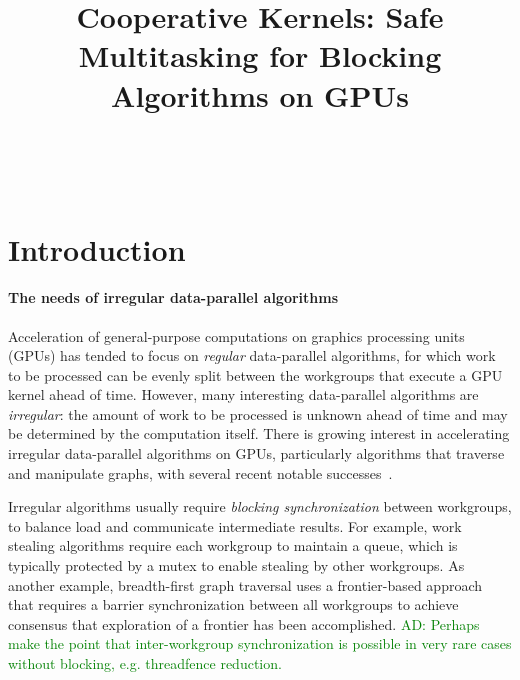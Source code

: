 \documentclass[nocopyrightspace]{sigplanconf-pldi16}
\newcommand{\ADComment}[1]{\textcolor{green}{AD: #1}}
\begin{document}
\title{Cooperative Kernels: Safe Multitasking for Blocking Algorithms on GPUs}

%
%

\authorinfo{}
{\makebox{} \\
}
{}




\maketitle

\begin{abstract}


\end{abstract}
    
\section{Introduction}\label{sec:intro}

\paragraph{The needs of irregular data-parallel algorithms}
Acceleration of general-purpose computations on graphics processing
units (GPUs) has tended to focus on \emph{regular} data-parallel
algorithms, for which work to be processed can be evenly split between
the workgroups that execute a GPU kernel ahead of time.  However, many
interesting data-parallel algorithms are \emph{irregular}: the amount
of work to be processed is unknown ahead of time and may be determined
by the computation itself.  There is growing interest in accelerating irregular
data-parallel algorithms on GPUs, particularly algorithms that
traverse and manipulate graphs, with several recent notable
successes~\cite{...}.

Irregular algorithms usually require \emph{blocking synchronization}
between workgroups, to balance load and communicate intermediate
results.  For example, work stealing algorithms require each workgroup
to maintain a queue, which is typically protected by a mutex to enable
stealing by other workgroups.  As another example, breadth-first graph
traversal uses a frontier-based approach that requires a barrier
synchronization between all workgroups to achieve consensus that
exploration of a frontier has been accomplished.  \ADComment{Perhaps
  make the point that inter-workgroup synchronization is possible in
  very rare cases without blocking, e.g. threadfence reduction.}
\end{document}
